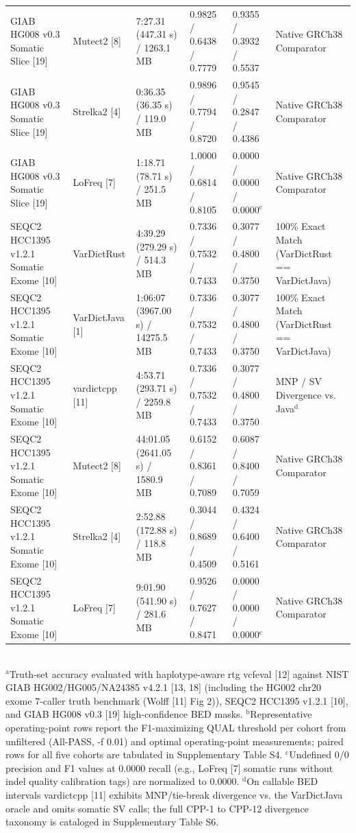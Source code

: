 \begin{table}[htbp]
{\begin{tabular}{llllll}
GIAB HG008 v0.3 Somatic Slice [19] & Mutect2 [8] & 7:27.31 (447.31 s) / 1263.1 MB & 0.9825 / 0.6438 / 0.7779 & 0.9355 / 0.3932 / 0.5537 & Native GRCh38 Comparator \\
GIAB HG008 v0.3 Somatic Slice [19] & Strelka2 [4] & 0:36.35 (36.35 s) / 119.0 MB & 0.9896 / 0.7794 / 0.8720 & 0.9545 / 0.2847 / 0.4386 & Native GRCh38 Comparator \\
GIAB HG008 v0.3 Somatic Slice [19] & LoFreq [7] & 1:18.71 (78.71 s) / 251.5 MB & 1.0000 / 0.6814 / 0.8105 & 0.0000 / 0.0000 / 0.0000$^{\text{c}}$ & Native GRCh38 Comparator \\
SEQC2 HCC1395 v1.2.1 Somatic Exome [10] & VarDictRust & 4:39.29 (279.29 s) / 514.3 MB & 0.7336 / 0.7532 / 0.7433 & 0.3077 / 0.4800 / 0.3750 & 100\% Exact Match (VarDictRust == VarDictJava) \\
SEQC2 HCC1395 v1.2.1 Somatic Exome [10] & VarDictJava [1] & 1:06:07 (3967.00 s) / 14275.5 MB & 0.7336 / 0.7532 / 0.7433 & 0.3077 / 0.4800 / 0.3750 & 100\% Exact Match (VarDictRust == VarDictJava) \\
SEQC2 HCC1395 v1.2.1 Somatic Exome [10] & vardictcpp [11] & 4:53.71 (293.71 s) / 2259.8 MB & 0.7336 / 0.7532 / 0.7433 & 0.3077 / 0.4800 / 0.3750 & MNP / SV Divergence vs. Java$^{\text{d}}$ \\
SEQC2 HCC1395 v1.2.1 Somatic Exome [10] & Mutect2 [8] & 44:01.05 (2641.05 s) / 1580.9 MB & 0.6152 / 0.8361 / 0.7089 & 0.6087 / 0.8400 / 0.7059 & Native GRCh38 Comparator \\
SEQC2 HCC1395 v1.2.1 Somatic Exome [10] & Strelka2 [4] & 2:52.88 (172.88 s) / 118.8 MB & 0.3044 / 0.8689 / 0.4509 & 0.4324 / 0.6400 / 0.5161 & Native GRCh38 Comparator \\
SEQC2 HCC1395 v1.2.1 Somatic Exome [10] & LoFreq [7] & 9:01.90 (541.90 s) / 281.6 MB & 0.9526 / 0.7627 / 0.8471 & 0.0000 / 0.0000 / 0.0000$^{\text{c}}$ & Native GRCh38 Comparator \\
\hline
\end{tabular}%
}
\\[4pt]\footnotesize{$^{\text{a}}$Truth-set accuracy evaluated with haplotype-aware rtg vcfeval [12] against NIST GIAB HG002/HG005/NA24385 v4.2.1 [13, 18] (including the HG002 chr20 exome 7-caller truth benchmark (Wolff [11] Fig 2)), SEQC2 HCC1395 v1.2.1 [10], and GIAB HG008 v0.3 [19] high-confidence BED masks. $^{\text{b}}$Representative operating-point rows report the F1-maximizing QUAL threshold per cohort from unfiltered (All-PASS, -f 0.01) and optimal operating-point measurements; paired rows for all five cohorts are tabulated in Supplementary Table S4. $^{\text{c}}$Undefined 0/0 precision and F1 values at 0.0000 recall (e.g., LoFreq [7] somatic runs without indel quality calibration tags) are normalized to 0.0000. $^{\text{d}}$On callable BED intervals vardictcpp [11] exhibits MNP/tie-break divergence vs. the VarDictJava oracle and omits somatic SV calls; the full CPP-1 to CPP-12 divergence taxonomy is cataloged in Supplementary Table S6.}
\end{table}
